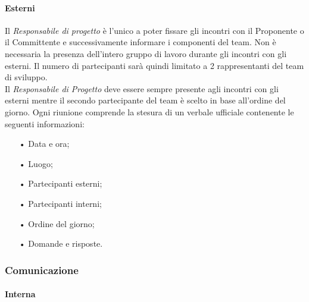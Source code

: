 \paragraph{Esterni}
Il \textit{Responsabile di progetto} è l'unico a poter fissare gli incontri con il Proponente o il Committente e successivamente informare i componenti del team. Non è necessaria la presenza dell'intero gruppo di lavoro durante gli incontri con gli esterni. Il numero di partecipanti sarà quindi limitato a 2 rappresentanti del team di sviluppo.  
\\
Il \textit{Responsabile di Progetto} deve essere sempre presente agli incontri con gli esterni mentre il secondo partecipante del team è scelto in base all'ordine del giorno. 
\newline
% 
Ogni riunione comprende la stesura di un verbale ufficiale contenente le seguenti informazioni:
\begin{itemize}
\item[•] Data e ora;
\item[•] Luogo;
\item[•] Partecipanti esterni;
\item[•] Partecipanti interni;
\item[•] Ordine del giorno;
\item[•] Domande e risposte.
\end{itemize}

\subsubsection{Comunicazione}

\paragraph{Interna}

